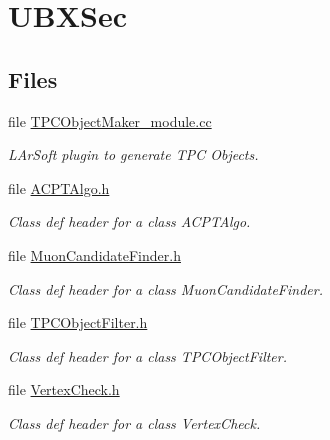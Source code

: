 \hypertarget{group__UBXSec}{\section{U\-B\-X\-Sec}
\label{group__UBXSec}
}
\subsection*{Files}
\begin{DoxyCompactItemize}
\item 
file \hyperlink{TPCObjectMaker__module_8cc}{T\-P\-C\-Object\-Maker\-\_\-module.\-cc}
\begin{DoxyCompactList}\small\item\em L\-Ar\-Soft plugin to generate T\-P\-C Objects. \end{DoxyCompactList}\item 
file \hyperlink{ACPTAlgo_8h}{A\-C\-P\-T\-Algo.\-h}
\begin{DoxyCompactList}\small\item\em Class def header for a class A\-C\-P\-T\-Algo. \end{DoxyCompactList}\item 
file \hyperlink{MuonCandidateFinder_8h}{Muon\-Candidate\-Finder.\-h}
\begin{DoxyCompactList}\small\item\em Class def header for a class Muon\-Candidate\-Finder. \end{DoxyCompactList}\item 
file \hyperlink{TPCObjectFilter_8h}{T\-P\-C\-Object\-Filter.\-h}
\begin{DoxyCompactList}\small\item\em Class def header for a class T\-P\-C\-Object\-Filter. \end{DoxyCompactList}\item 
file \hyperlink{VertexCheck_8h}{Vertex\-Check.\-h}
\begin{DoxyCompactList}\small\item\em Class def header for a class Vertex\-Check. \end{DoxyCompactList}\end{DoxyCompactItemize}
